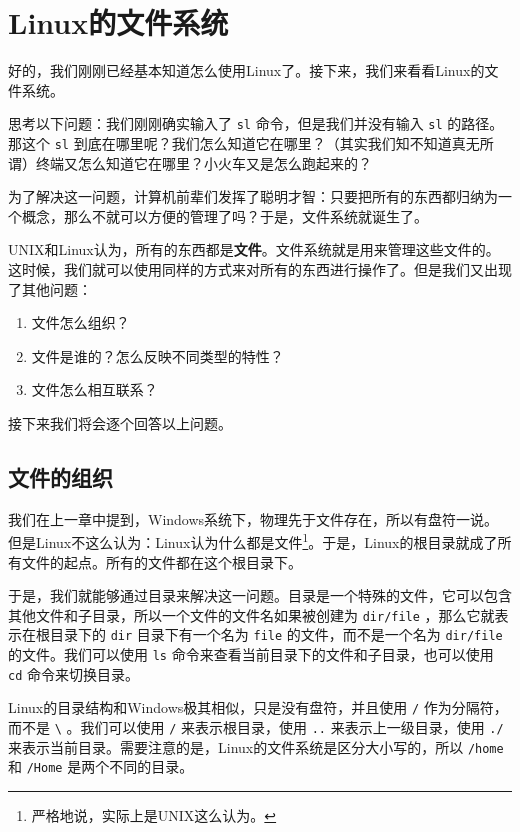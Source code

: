 \section{Linux的文件系统}

好的，我们刚刚已经基本知道怎么使用Linux了。接下来，我们来看看Linux的文件系统。

思考以下问题：我们刚刚确实输入了 \texttt{sl} 命令，但是我们并没有输入 \texttt{sl} 的路径。那这个 \texttt{sl} 到底在哪里呢？我们怎么知道它在哪里？（其实我们知不知道真无所谓）终端又怎么知道它在哪里？小火车又是怎么跑起来的？

为了解决这一问题，计算机前辈们发挥了聪明才智：只要把所有的东西都归纳为一个概念，那么不就可以方便的管理了吗？于是，文件系统就诞生了。

UNIX和Linux认为，所有的东西都是\textbf{文件}。文件系统就是用来管理这些文件的。这时候，我们就可以使用同样的方式来对所有的东西进行操作了。但是我们又出现了其他问题：

\begin{enumerate}
  \item 文件怎么组织？
  \item 文件是谁的？怎么反映不同类型的特性？
  \item 文件怎么相互联系？
\end{enumerate}

接下来我们将会逐个回答以上问题。

\subsection{文件的组织}

我们在上一章中提到，Windows系统下，物理先于文件存在，所以有盘符一说。但是Linux不这么认为：Linux认为什么都是文件\footnote{严格地说，实际上是UNIX这么认为。}。于是，Linux的根目录\text{/}就成了所有文件的起点。所有的文件都在这个根目录下。

于是，我们就能够通过目录来解决这一问题。目录是一个特殊的文件，它可以包含其他文件和子目录，所以一个文件的文件名如果被创建为 \texttt{dir/file} ，那么它就表示在根目录下的 \texttt{dir} 目录下有一个名为 \texttt{file} 的文件，而不是一个名为 \texttt{dir/file} 的文件。我们可以使用 \texttt{ls} 命令来查看当前目录下的文件和子目录，也可以使用 \texttt{cd} 命令来切换目录。

Linux的目录结构和Windows极其相似，只是没有盘符，并且使用 \texttt{/} 作为分隔符，而不是 \texttt{\textbackslash} 。我们可以使用 \texttt{/} 来表示根目录，使用 \texttt{..} 来表示上一级目录，使用 \texttt{./} 来表示当前目录。需要注意的是，Linux的文件系统是区分大小写的，所以 \texttt{/home} 和 \texttt{/Home} 是两个不同的目录。

